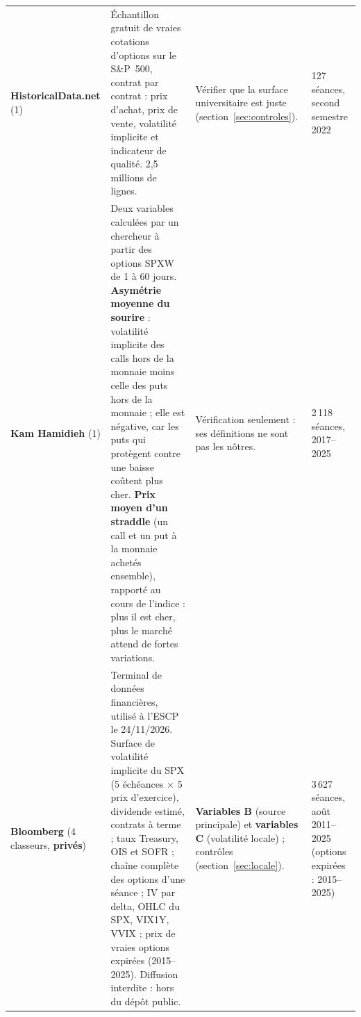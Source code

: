 \documentclass[10pt,a4paper]{article}
\begin{document}
{\begin{longtable}{@{}L{2.75cm} L{6.15cm} L{4.6cm} L{2.5cm}@{}}
\textbf{HistoricalData.net} \cite{histdata} (1) & Échantillon gratuit de vraies cotations d'options sur le S\&P~500, contrat par contrat : prix d'achat, prix de vente, volatilité implicite et indicateur de qualité. 2,5 millions de lignes. & Vérifier que la surface universitaire est juste (section~\ref{sec:controles}). & 127 séances, second semestre 2022 \\
\textbf{Kam Hamidieh} \cite{hamidieh} (1) & Deux variables calculées par un chercheur à partir des options SPXW de 1 à 60 jours. \textbf{Asymétrie moyenne du sourire} : volatilité implicite des calls hors de la monnaie moins celle des puts hors de la monnaie ; elle est négative, car les puts qui protègent contre une baisse coûtent plus cher. \textbf{Prix moyen d'un straddle} (un call et un put à la monnaie achetés ensemble), rapporté au cours de l'indice : plus il est cher, plus le marché attend de fortes variations. & Vérification seulement : ses définitions ne sont pas les nôtres. & 2\,118 séances, 2017–2025 \\
\textbf{Bloomberg} \cite{bbg} (4 classeurs, \textbf{privés}) & Terminal de données financières, utilisé à l'ESCP le 24/11/2026. Surface de volatilité implicite du SPX (5 échéances × 5 prix d'exercice), dividende estimé, contrats à terme ; taux Treasury, OIS et SOFR ; chaîne complète des options d'une séance ; IV par delta, OHLC du SPX, VIX1Y, VVIX ; prix de vraies options expirées (2015–2025). Diffusion interdite : hors du dépôt public. & \textbf{Variables B} (source principale) et \textbf{variables C} (volatilité locale) ; contrôles (section~\ref{sec:locale}). & 3\,627 séances, août 2011–2025 (options expirées : 2015–2025) \\
\end{longtable}}
\end{document}

